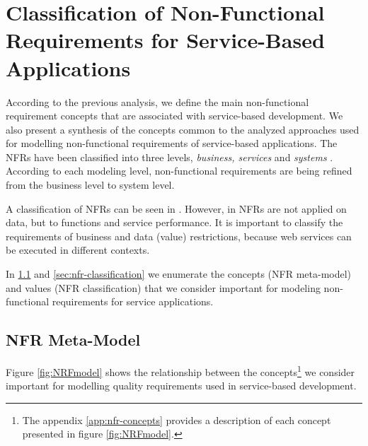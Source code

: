 
\section{Classification of Non-Functional Requirements for Service-Based
Applications}
\label{sec:classification}

 
According to the previous analysis, we define the main non-functional
requirement concepts that are associated with service-based development. We also
present a synthesis of the concepts common to the analyzed approaches used for
modelling non-functional requirements of service-based applications. The NFRs
have been classified into three levels, \textit{business, services} and
\textit{systems} . According to
each modeling level, non-functional requirements are being refined from the business level to system level.

 A classification of NFRs can be seen in \cite{Yeom2006}.
 However, in \cite{Yeom2006} NFRs are not applied on data, but to functions and
 service performance. It is important to classify the
 requirements of business and data (value) restrictions, because web
 services can be executed in different contexts.
  
 In  \ref{sec:nfr-metamodel} and
 \ref{sec:nfr-classification} we enumerate the concepts (NFR meta-model) and values (NFR classification) that
 we consider important for modeling non-functional requirements for service
 applications.
 
 \subsection{NFR Meta-Model} 
\label{sec:nfr-metamodel}

Figure \ref{fig:NRFmodel} shows the relationship between the
concepts\footnote{The appendix \ref{app:nfr-concepts} provides a description of
each concept presented in figure \ref{fig:NRFmodel}.} we consider important for
modelling quality requirements used in service-based development.


